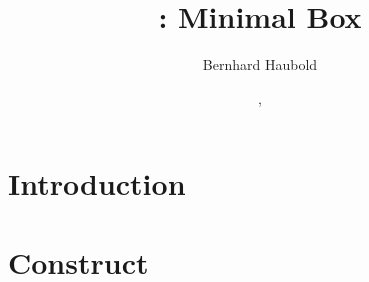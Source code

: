 \documentclass[a4paper]{report}
\begin{document}
\pagestyle{noweb}

\title{: Minimal Box}
\author{Bernhard Haubold}
\date{\!\!, }
\maketitle

\tableofcontents

\chapter{Introduction}

\chapter{Construct }\label{ch:mix}



\end{document}
